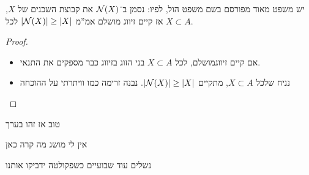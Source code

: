 \documentclass[]{../../../../tex/classes/styledArticle}
\begin{document}
	יש משפט מאוד מפורסם בשם משפט הול, לפיו: נסמן ב־$\mathcal{N}(X)$ את קבוצת השכנים של $X$, אז קיים זיווג מושלם אמ''מ $\left \lvert \mathcal{N}(X) \right \rvert \ge \left \lvert X \right \rvert$ לכל $X \subset A$. 
	\begin{proof}
		\begin{itemize}
			\item אם קיים זיווגמושלם, לכל $X \subset A$ בני הזוג בזיווג כבר מספקים את התנאי. 
			\item נניח שלכל $X \subset A$, מתקיים $\left \lvert \mathcal{N}(X) \right \rvert \ge \left \lvert X \right \rvert$. נבנה זרימה כמו וויתרתי על ההוכחה
		\end{itemize}
	\end{proof}
	
	
	טוב אז זהו בערך
	
	אין לי מושג מה קרה כאן
	
	נשלים עוד שבועיים כשפקולטה ידביקו אותנו

	
	\ndoc
\end{document}
